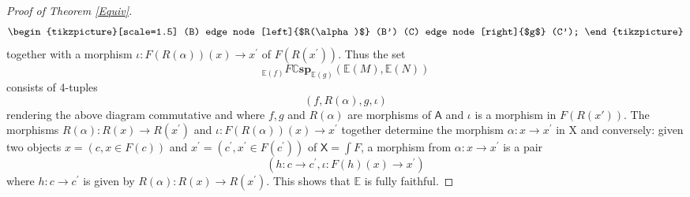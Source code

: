 \documentclass[oneside,final]{ucr}
\theoremstyle{definition}
\begin{document}
{\begin{proof}[Proof of Theorem \ref{Equiv}]
\[\begin{tikzpicture}[scale=1.5]
(B) edge node [left]{$R(\alpha)$} (B')
(C) edge node [right]{$g$} (C');
\end{tikzpicture}
\]
together with a morphism $\iota \colon F(R(\alpha))(x) \to x^\prime$ of $F(R(x^\prime))$.
Thus the set $$_{\mathbb{E}(f)} {F\mathbb{C}\mathbf{sp}}_{\mathbb{E}(g)}(\mathbb{E}(M),\mathbb{E}(N))$$ consists of 4-tuples $$(f,R(\alpha),g,\iota)$$ rendering the above diagram commutative and where $f,g$ and $R(\alpha)$ are morphisms of $\mathsf{A}$ and $\iota$ is a morphism in $F(R(x'))$. The morphisms $R(\alpha) \colon R(x) \to R(x^\prime)$ and $\iota \colon F(R(\alpha))(x) \to x^\prime$ together determine the morphism $\alpha \colon x \to x^\prime$ in $\mathrm{X}$ and conversely: given two objects $x=(c,x \in F(c))$ and $x^\prime=(c^\prime,x^\prime \in F(c^\prime))$ of $\mathsf{X}=\int{F}$, a morphism from $\alpha \colon x \to x^\prime$ is a pair $$(h \colon c \to c^\prime, \iota \colon F(h)(x) \to x^\prime)$$ where $h \colon c \to c^\prime$ is given by $R(\alpha) \colon R(x) \to R(x^\prime)$. This shows that $\mathbb{E}$ is fully faithful.


\end{proof}}
\end{document}
